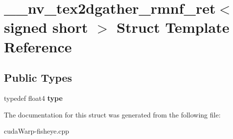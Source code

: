 \hypertarget{struct____nv__tex2dgather__rmnf__ret_3_01signed_01short_01_4}{}\section{\+\_\+\+\_\+nv\+\_\+tex2dgather\+\_\+rmnf\+\_\+ret$<$ signed short $>$ Struct Template Reference}
\label{struct____nv__tex2dgather__rmnf__ret_3_01signed_01short_01_4}
\subsection*{Public Types}
\begin{DoxyCompactItemize}
\item 
typedef float4 {\bfseries type}\hypertarget{struct____nv__tex2dgather__rmnf__ret_3_01signed_01short_01_4_a84723a1e38896c25aa3bfbf88bd4908f}{}\label{struct____nv__tex2dgather__rmnf__ret_3_01signed_01short_01_4_a84723a1e38896c25aa3bfbf88bd4908f}

\end{DoxyCompactItemize}


The documentation for this struct was generated from the following file\+:\begin{DoxyCompactItemize}
\item 
cuda\+Warp-\/fisheye.\+cpp\end{DoxyCompactItemize}
